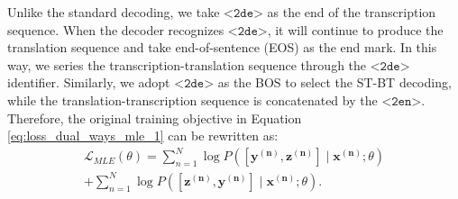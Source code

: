\documentclass[letterpaper]{article} %
\begin{document}
Unlike the standard decoding, we take $\texttt{<2de>}$ as the end of the transcription sequence.
When the decoder recognizes $\texttt{<2de>}$, it will continue to produce the translation sequence and take end-of-sentence (EOS) as the end mark. 
In this way, we series the transcription-translation sequence through the $\texttt{<2de>}$ identifier. 
Similarly, we adopt $\texttt{<2de>}$ as the BOS to select the ST-BT decoding, while the translation-transcription sequence is concatenated by the $\texttt{<2en>}$.
Therefore, the original training objective in Equation \ref{eq:loss_dual_ways_mle_1} can be rewritten as:
\begin{equation}
    \begin{aligned}
    \mathcal{L}_{MLE}(\theta) = \sum_{n=1}^{N} \log P\left([\mathbf{y^{(n)}}, \mathbf{z^{(n)}}] \mid \mathbf{x^{(n)}} ; \theta\right)  \\ 
     + \sum_{n=1}^{N} \log P\left([\mathbf{z^{(n)}}, \mathbf{y^{(n)}}] \mid \mathbf{x^{(n)}} ; \theta\right).
    \end{aligned}
    \label{eq:loss_dual_ways_mle}
\end{equation}
\end{document}
